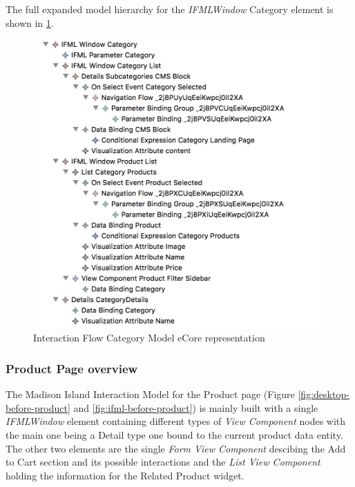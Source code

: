 \newpage
The full expanded model hierarchy for the \textit{IFMLWindow} Category element is shown in \ref{fig:ifml-before-hierarchy-category}.

\vspace{0.5cm}
\begin{figure}[H]
  \centering
    \includegraphics[width=13cm]{images/diagrams/before/ifml-hierarchy-category.png}
  \caption{Interaction Flow Category Model eCore representation}
  \label{fig:ifml-before-hierarchy-category}
\end{figure}
\vspace{0.5cm}


\subsubsection{Product Page overview}

The Madison Island Interaction Model for the Product page (Figure \ref{fig:desktop-before-product} and \ref{fig:ifml-before-product}) is mainly built with a single \textit{IFMLWindow} element containing different types of \textit{View Component} nodes with the main one being a Detail type one bound to the current product data entity. The other two elements are the single \textit{Form View Component} descibing the Add to Cart section and its possible interactions and the \textit{List View Component} holding the information for the Related Product widget.

